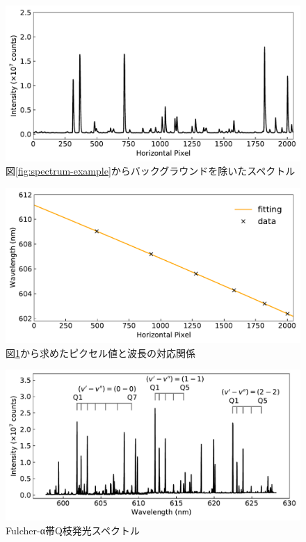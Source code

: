 \begin{figure}
    \centering
    \includegraphics[width=15cm]{pictures/true-spectrum-example.pdf}
    \caption{図\ref{fig:spectrum-example}からバックグラウンドを除いたスペクトル}
    \label{fig:true-spectrum-example}
\end{figure}

\begin{figure}
    \centering
    \includegraphics[width=15cm]{pictures/pixel-to-wavelength.pdf}
    \caption{図\ref{fig:true-spectrum-example}から求めたピクセル値と波長の対応関係}
    \label{fig:pixel-to-wavelength}
\end{figure}

\begin{figure}
    \centering
    \includegraphics[width=15cm]{pictures/all-spectrum.pdf}
    \caption{Fulcher-α帯Q枝発光スペクトル}
    \label{fig:all-spectrum}
\end{figure}

